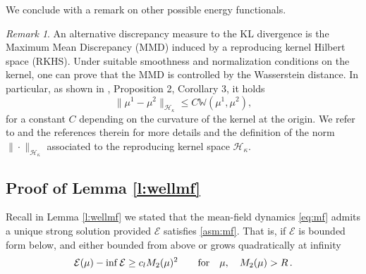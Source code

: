 \documentclass{article}
\theoremstyle{plain}
\theoremstyle{definition}
\theoremstyle{remark}
\newtheorem{remark}[theorem]{Remark}
\newcommand{\E}{\mathcal{E}}
\newcommand{\W}{\mathbb{W}}
\begin{document}
We conclude with a remark on other possible energy functionals.

\begin{remark}
    An alternative discrepancy measure to the KL divergence is the Maximum Mean Discrepancy (MMD) induced by a reproducing kernel Hilbert space (RKHS). Under suitable smoothness and normalization conditions on the kernel, one can prove that the MMD is controlled by the Wasserstein distance. In particular, as shown in \cite{vayer2023kernel}, Proposition 2, Corollary 3,  it holds
\[
\|\mu^1 - \mu^2\|_{\mathcal{H}_\kappa} \leq C \W(\mu^1, \mu^2),
\]
for a constant $C$ depending on the curvature of the kernel at the origin. We refer to \cite{vayer2023kernel} and the references therein for more details and the definition of the norm $\|\cdot\|_{\mathcal{H}_\kappa}$ associated to the reproducing kernel space $\mathcal{H}_\kappa$.
\end{remark}

\subsection{Proof of Lemma \ref{l:wellmf}} \label{app:proofs:mf}

Recall in Lemma \ref{l:wellmf} we stated that the mean-field dynamics \eqref{eq:mf} admits a unique strong solution provided $\E$ satisfies \cref{asm:mf}. That is, if $\E$ is bounded form below, and either bounded from above or grows quadratically at infinity 
\begin{equation}\label{eq:growth}
\E(\mu) - \inf \E \geq c_l M_2(\mu)^2 \qquad \textup{for}\quad \mu, \quad M_2(\mu)>R\,.
\end{equation}
\end{document}
